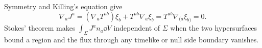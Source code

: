 \begin{enumerate}[leftmargin=2.8em,itemsep=1.2em]
Symmetry and Killing's equation give
\[
 \nabla_aJ^a=(\nabla_aT^{ab})\xi_b+T^{ab}\nabla_a\xi_b
 =T^{ab}\nabla_{(a}\xi_{b)}=0.
\]
Stokes' theorem makes \(\int_\Sigma J^a n_a\dd V\) independent of \(\Sigma\)
when the two hypersurfaces bound a region and the flux through any timelike or
null side boundary vanishes.
\end{enumerate}
